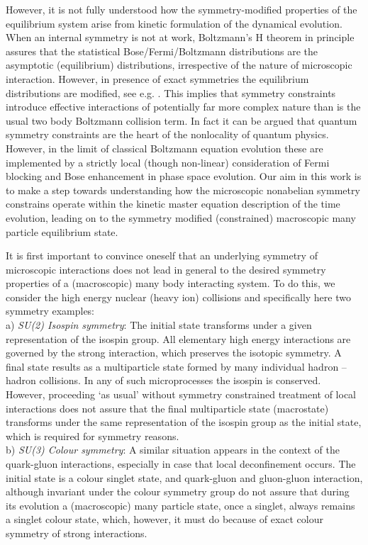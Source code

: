 \documentclass[a4paper,11pt]{article}
\begin{document}
However, it is not fully understood how the symmetry-modified
properties of the  equilibrium system arise from kinetic
formulation of the dynamical evolution.  When an internal symmetry
is not at work, Boltzmann's H theorem in principle assures that
the statistical Bose/Fermi/Boltzmann distributions are the
asymptotic (equilibrium) distributions, irrespective of the nature
of microscopic interaction. However, in presence of exact
symmetries the equilibrium distributions are modified, see e.g.
\cite{Turko,MullRaf}.  This implies that symmetry constraints
introduce effective interactions of potentially far more complex
nature than is the usual two body Boltzmann collision term. In
fact it can be argued that quantum symmetry constraints are the
heart of the nonlocality of quantum physics. However, in the limit
of classical Boltzmann equation evolution these are implemented by
a strictly local (though non-linear) consideration of Fermi
blocking and Bose enhancement in phase space evolution.  Our aim
in this work is to make a step towards understanding how the
microscopic  nonabelian symmetry constrains operate within the
kinetic master equation description of the time evolution, leading
on to the symmetry modified (constrained) macroscopic many
particle equilibrium state.

It is first important to convince oneself that an underlying
symmetry of microscopic interactions does not lead in general to
the desired symmetry properties of a (macroscopic) many body
interacting  system. To do this, we consider the high energy
nuclear (heavy ion) collisions and specifically here two
symmetry examples:\\

a) {\it SU(2) Isospin symmetry}: The initial state transforms
under a given representation of the isospin \coordHE{} group. All
elementary high energy interactions are governed by the strong
interaction, which preserves the isotopic symmetry. A final state
results as a multiparticle state formed by many individual hadron
-- hadron collisions. In any of such microprocesses the isospin is
conserved. However, proceeding `as usual' without symmetry
constrained treatment of local interactions  does not assure that
the final multiparticle state (macrostate)  transforms under the
same representation of the isospin group as the initial state,
which is required for
symmetry reasons. \\

b) {\it SU(3) Colour symmetry}: A similar situation appears in the
context of the quark-gluon interactions, especially in case that
local deconfinement occurs. The initial state is a colour singlet
state, and  quark-gluon and gluon-gluon interaction, although
invariant under the colour \coordHE{} symmetry group do not assure
that during its evolution a (macroscopic) many particle state,
once a singlet, always remains a singlet colour state, which,
however, it must do because
of exact colour symmetry of strong interactions.\\
\end{document}
